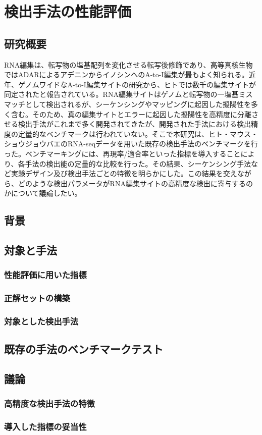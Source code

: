 \chapter{検出手法の性能評価}

\section{研究概要}
RNA編集は、転写物の塩基配列を変化させる転写後修飾であり、高等真核生物ではADARによるアデニンからイノシンへのA-to-I編集が最もよく知られる。近年、ゲノムワイドなA-to-I編集サイトの研究から、ヒトでは数千の編集サイトが同定されたと報告されている。RNA編集サイトはゲノムと転写物の一塩基ミスマッチとして検出されるが、シーケンシングやマッピングに起因した擬陽性を多く含む。そのため、真の編集サイトとエラーに起因した擬陽性を高精度に分離させる検出手法がこれまで多く開発されてきたが、開発された手法における検出精度の定量的なベンチマークは行われていない。そこで本研究は、ヒト・マウス・ショウジョウバエのRNA-seqデータを用いた既存の検出手法のベンチマークを行った。ベンチマーキングには、再現率/適合率といった指標を導入することにより、各手法の検出能の定量的な比較を行った。その結果、シーケンシング手法など実験デザイン及び検出手法ごとの特徴を明らかにした。この結果を交えながら、どのような検出パラメータがRNA編集サイトの高精度な検出に寄与するのかについて議論したい。

\section{背景}

\section{対象と手法}
\subsection{性能評価に用いた指標}
\subsection{正解セットの構築}
\subsection{対象とした検出手法}

\section{既存の手法のベンチマークテスト}

\section{議論}
\subsection{高精度な検出手法の特徴}
\subsection{導入した指標の妥当性}
